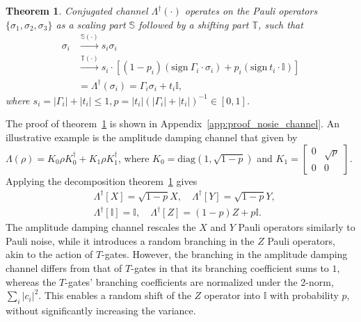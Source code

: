 \documentclass[aps,%
twocolumn,%
floatfix,%
pra,%
amsfonts,%
longbibliography,%
groupedaddress,%
superscriptaddress]{revtex4-2}%
\newtheorem{theorem}{Theorem}
\newcommand{\1}{\mathbbm{1}}
\begin{document}
\begin{theorem}\label{theo:non-unital_back-propagation}
Conjugated channel \( \Lambda^\dagger(\cdot) \) operates on the Pauli operators \( \{ \sigma_1, \sigma_2, \sigma_3 \} \) as a scaling part \( \mathbb{S} \) followed by a shifting part \( \mathbb{T} \), such that
   \begin{align}
       \sigma_i &\xrightarrow{\mathbb{S}(\cdot)} s_i \sigma_i\\
       &\xrightarrow{\mathbb{T}(\cdot)} s_i\cdot \left[(1 - p_i)(\text{sign}~\Gamma_i \cdot \sigma_i) + p_i(\text{sign}~t_i\cdot\mathbb{I})\right]\\
       &= \Lambda^\dagger(\sigma_i) = \Gamma_i \sigma_i + t_i \mathbb{I},
   \end{align}
   where $s_i = |\Gamma_i| + |t_i| \leq 1, p = {|t_i|}{(|\Gamma_i| + |t_i|)}^{-1} \in [0,1]$. 
\end{theorem}
The proof of theorem~\ref{theo:non-unital_back-propagation} is shown in Appendix~\ref{app:proof_nosie_channel}.  An illustrative example is the amplitude damping channel that given by $\Lambda(\rho) = K_0 \rho K_0^\dagger + K_1 \rho K_1^\dagger$, where $K_0 = \text{diag}(1, \sqrt{1 - p})$ and $K_1 = \begin{bmatrix} 0 & \sqrt{p} \\ 0 & 0 \end{bmatrix}$. 
Applying the decomposition theorem~\ref{theo:non-unital_back-propagation} gives
\begin{align}
   &\Lambda^\dagger[X] = \sqrt{1 - p} X, \quad \Lambda^\dagger[Y] = \sqrt{1 - p} Y, \\
   &\Lambda^\dagger[\mathbb{I}] = \mathbb{I}, \quad \Lambda^\dagger[Z] = (1 - p) Z + p \mathbb{I}. 
\end{align}
The amplitude damping channel rescales the $X$ and $Y$ Pauli operators similarly to Pauli noise, while it introduces a random branching in the $Z$ Pauli operators, akin to the action of $T$-gates. However, the branching in the amplitude damping channel differs from that of $T$-gates in that its branching coefficient sums to $1$, whereas the $T$-gates' branching coefficients are normalized under the 2-norm, $\sum_i |c_i|^2$. This enables a random shift of the $Z$ operator into $\mathbb{I}$ with probability $p$, without significantly increasing the variance. 

\end{document}
